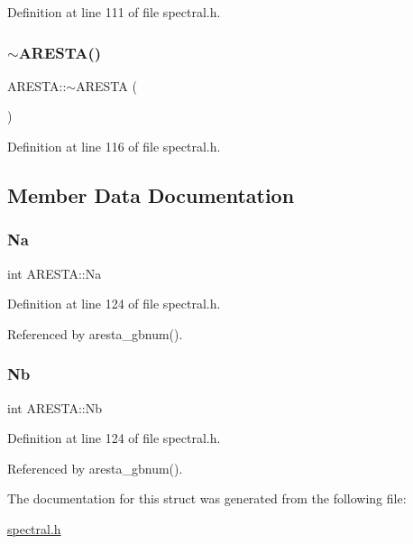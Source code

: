 Definition at line 111 of file spectral.\+h.

\mbox{\label{structARESTA_a349803b7ca02126d64a1ebc0aac40e45}} 
\subsubsection{\texorpdfstring{$\sim$\+A\+R\+E\+S\+T\+A()}{~ARESTA()}}
{\footnotesize\ttfamily A\+R\+E\+S\+T\+A\+::$\sim$\+A\+R\+E\+S\+TA (\begin{DoxyParamCaption}{ }\end{DoxyParamCaption})\hspace{0.3cm}{\ttfamily [inline]}}



Definition at line 116 of file spectral.\+h.



\subsection{Member Data Documentation}
\mbox{\label{structARESTA_a0fc059fd8adea074928f975cf03ac1fc}} 
\subsubsection{\texorpdfstring{Na}{Na}}
{\footnotesize\ttfamily int A\+R\+E\+S\+T\+A\+::\+Na}



Definition at line 124 of file spectral.\+h.



Referenced by aresta\+\_\+gbnum().

\mbox{\label{structARESTA_a868b061b4a37cb972790ed3f5ec6c45a}} 
\subsubsection{\texorpdfstring{Nb}{Nb}}
{\footnotesize\ttfamily int A\+R\+E\+S\+T\+A\+::\+Nb}



Definition at line 124 of file spectral.\+h.



Referenced by aresta\+\_\+gbnum().



The documentation for this struct was generated from the following file\+:\begin{DoxyCompactItemize}
\item 
\hyperlink{spectral_8h}{spectral.\+h}\end{DoxyCompactItemize}

